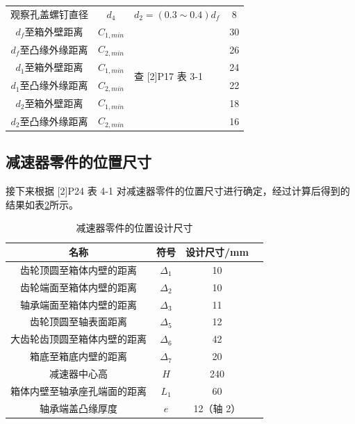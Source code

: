 \documentclass[12pt]{ctexart}
\begin{document}
\begin{table}[htbp]
\begin{tabular}{c c l c}
        观察孔盖螺钉直径              & $d_4$        & $d_2=(0.3\sim 0.4)d_f$          & 8 \\
        $d_f$至箱外壁距离             & $C_{1,min}$  & \multirow{6}{*}{查 [2]P17 表 3-1}  & 30\\
        $d_f$至凸缘外缘距离           & $C_{2,min}$  & & 26\\
        $d_1$至箱外壁距离             & $C_{1,min}$  & & 24\\
        $d_1$至凸缘外缘距离           & $C_{2,min}$  & & 22\\
        $d_2$至箱外壁距离             & $C_{1,min}$  & & 18\\
        $d_2$至凸缘外缘距离           & $C_{2,min}$  & & 16\\

         \bottomrule
    \end{tabular}
    
    \label{table11}
\end{table}

\subsection{减速器零件的位置尺寸}

接下来根据 [2]P24 表 4-1 对减速器零件的位置尺寸进行确定，经过计算后得到的结果如表\ref{table30}所示。

\begin{table}[htbp]
    \centering
    \setlength{\belowcaptionskip}{0.3cm}
    \caption{减速器零件的位置设计尺寸}
    \begin{tabular}{c c c c}
        \toprule
        名称 & 符号 & 设计尺寸/mm \\
        \midrule
        齿轮顶圆至箱体内壁的距离     & $\Delta_1$ & 10 \\
        齿轮端面至箱体内壁的距离     & $\Delta_2$ & 10 \\
        轴承端面至箱体内壁的距离     & $\Delta_3$ & 11 \\
        齿轮顶圆至轴表面距离         & $\Delta_5$ & 12 \\
        大齿轮齿顶圆至箱体内壁的距离  & $\Delta_6$ & 42 \\
        箱底至箱底内壁的距离         & $\Delta_7$ & 20 \\
        减速器中心高                & $H$        & 240 \\
        箱体内壁至轴承座孔端面的距离  & $L_1$      & 60 \\
        轴承端盖凸缘厚度            & $e$         & 12（轴 2）\\
        
        \bottomrule
    \end{tabular}
    
    \label{table30}
\end{table}
\end{document}
